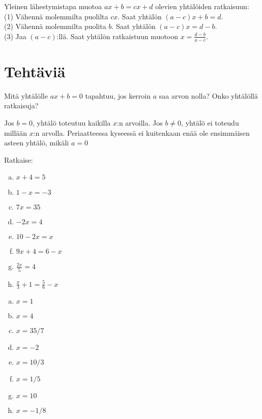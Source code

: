 \begin{esimerkki}
Yleinen lähestymistapa muotoa $ax+b = cx+d$ olevien yhtälöiden ratkaisuun: \\
(1) Vähennä molemmilta puolilta $cx$. Saat yhtälön $(a-c)x + b = d$. \\
(2) Vähennä molemmilta puolita $b$. Saat yhtälön $(a-c)x = d-b$. \\
(3) Jaa $(a-c)$:llä. Saat yhtälön ratkaistuun muotoon $x = \frac{d-b}{a-c}$.
\end{esimerkki}

\section*{Tehtäviä}

\begin{tehtava}
Mitä yhtälölle $ax+b = 0$ tapahtuu, jos kerroin $a$ saa arvon nolla?
Onko yhtälöllä ratkaisuja?
\begin{vastaus}
Jos $b = 0$, yhtälö toteutuu kaikilla $x$:n arvoilla. Jos $b \neq 0$, yhtälö
ei toteudu millään $x$:n arvolla. Periaatteessa kyseessä ei kuitenkaan
enää ole ensimmäisen asteen yhtälö, mikäli $a = 0$
\end{vastaus}
\end{tehtava}

\begin{tehtava}
%
Ratkaise:
\begin{enumerate}[a)]
\item $x + 4 = 5$
\item $1 - x = -3$
\item $7x = 35$
\item $-2x = 4$
\item $10 - 2x = x$
\item $9x + 4 = 6 - x$
\item $\frac{2x}{5} = 4$
\item $\frac{x}{3} + 1 = \frac{5}{6} - x$
\end{enumerate}
\begin{vastaus}
\begin{enumerate}[a)]
\item $x=1$
\item $x=4$
\item $x=35/7$
\item $x=-2$
\item $x=10/3$
\item $x=1/5$
\item $x=10$
\item $x=-1/8$
\end{enumerate}
\end{vastaus}
\end{tehtava}

